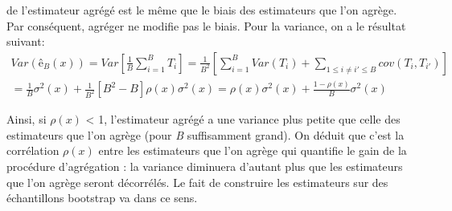 \begin{small}
	de l’estimateur agrégé est le même que le biais des estimateurs que l’on agrège. Par conséquent,
	agréger ne modifie pas le biais. Pour la variance, on a le résultat suivant:
	\begin{equation*}
	\begin{split}	
	Var(ê_B(x)) = Var [ \frac{1}{B} \sum_{i=1}^{B} T_i] = \frac{1}{B^2} [\sum_{i=1}^{B} Var(T_i) + \sum_{1 \leq i \neq i' \leq B} cov(T_i,T_{i'}) ] \\ = \frac{1}{B}\sigma^2(x) + \frac{1}{B^2}[B^2-B]\rho(x)\sigma^2(x) = \rho(x)\sigma^2(x) + \frac{1-\rho(x)}{B}\sigma^2(x)
	\end{split}
	\end{equation*}

	Ainsi, si $\rho(x)$ < 1, l’estimateur agrégé a une variance plus petite que celle des estimateurs que l’on
	agrège (pour \textit{B} suffisamment grand). On déduit que c’est la corrélation $\rho(x)$ entre les estimateurs que l’on agrège qui quantifie le gain de la procédure d’agrégation : la variance diminuera d’autant plus que les estimateurs que l’on agrège seront décorrélés. Le fait de construire les estimateurs sur des échantillons bootstrap va dans ce sens.
		\end{small}
		
